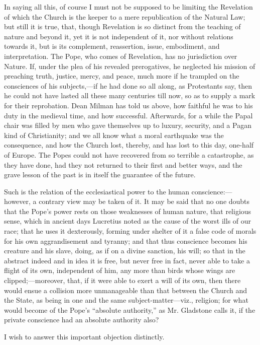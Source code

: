 In saying all this, of course I must not be supposed to be limiting
the Revelation of which the Church is the keeper to a mere republication
of the Natural Law; but still it is true, that, though Revelation is so
distinct from the teaching of nature and beyond it, yet it is not
independent of it, nor without relations towards it, but is its
complement, reassertion, issue, embodiment, and interpretation. The
Pope, who comes of Revelation, has no jurisdiction over Nature. If,
under the plea of his revealed prerogatives, he neglected his mission of
preaching truth, justice, mercy, and peace, much more if he trampled on
the consciences of his subjects,—if he had done so all along, as
Protestants say, then he could not have lasted all these many centuries
till now, so as to supply a mark for their reprobation. Dean Milman has
told us above, how faithful he was to his duty in the medieval time, and
how successful. Afterwards, for a while the Papal chair was filled by
men who gave themselves up to luxury, security, and a Pagan kind of
Christianity; and we all know what a moral earthquake was the
consequence, and how the Church lost, thereby, and has lost to this day,
one-half of Europe. The Popes could not have recovered from so terrible
a catastrophe, as they have done, had they not returned to their
first and better ways, and the grave lesson of the past is in itself the
guarantee of the future.

Such is the relation of the ecclesiastical power to the human
conscience:—however, a contrary view may be taken of it. It may be
said that no one doubts that the Pope's power rests on those weaknesses
of human nature, that religious sense, which in ancient days Lucretius
noted as the cause of the worst ills of our race; that he uses it
dexterously, forming under shelter of it a false code of morals for his
own aggrandisement and tyranny; and that thus conscience becomes his
creature and his slave, doing, as if on a divine sanction, his will; so
that in the abstract indeed and in idea it is free, but never free in
fact, never able to take a flight of its own, independent of him, any
more than birds whose wings are clipped;—moreover, that, if it were
able to exert a will of its own, then there would ensue a collision more
unmanageable than that between the Church and the State, as being in one
and the same subject-matter—viz., religion; for what would become of
the Pope's ``absolute authority,'' as Mr. Gladstone calls it, if
the private conscience had an absolute authority also?

I wish to answer this important objection distinctly.


